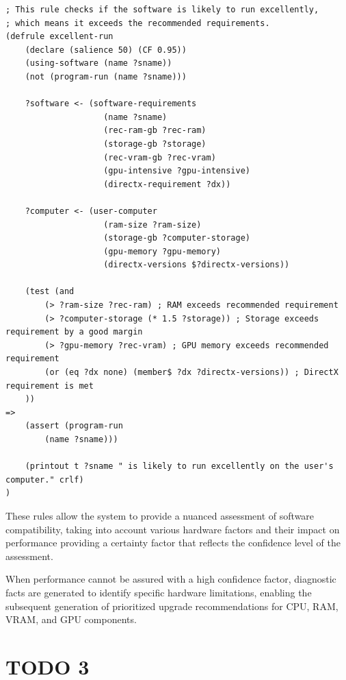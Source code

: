 \documentclass{article}
\begin{document}
\begin{file}
    \begin{lstlisting}
; This rule checks if the software is likely to run excellently,
; which means it exceeds the recommended requirements.
(defrule excellent-run
    (declare (salience 50) (CF 0.95))
    (using-software (name ?sname))
    (not (program-run (name ?sname)))
    
    ?software <- (software-requirements
                    (name ?sname)
                    (rec-ram-gb ?rec-ram)
                    (storage-gb ?storage)
                    (rec-vram-gb ?rec-vram)
                    (gpu-intensive ?gpu-intensive)
                    (directx-requirement ?dx))
    
    ?computer <- (user-computer
                    (ram-size ?ram-size)
                    (storage-gb ?computer-storage)
                    (gpu-memory ?gpu-memory)
                    (directx-versions $?directx-versions))
    
    (test (and 
        (> ?ram-size ?rec-ram) ; RAM exceeds recommended requirement
        (> ?computer-storage (* 1.5 ?storage)) ; Storage exceeds requirement by a good margin
        (> ?gpu-memory ?rec-vram) ; GPU memory exceeds recommended requirement
        (or (eq ?dx none) (member$ ?dx ?directx-versions)) ; DirectX requirement is met
    ))
=>
    (assert (program-run
        (name ?sname)))
    
    (printout t ?sname " is likely to run excellently on the user's computer." crlf)
)
\end{lstlisting}
\end{file}

These rules allow the system to provide a nuanced assessment of software compatibility, taking into account various hardware factors and their impact on performance providing a certainty factor that reflects the confidence level of the assessment.



When performance cannot be assured with a high confidence factor, diagnostic facts are generated to identify specific hardware limitations, enabling the subsequent generation of prioritized upgrade recommendations for CPU, RAM, VRAM, and GPU components.


\section*{TODO 3}
\end{document}
